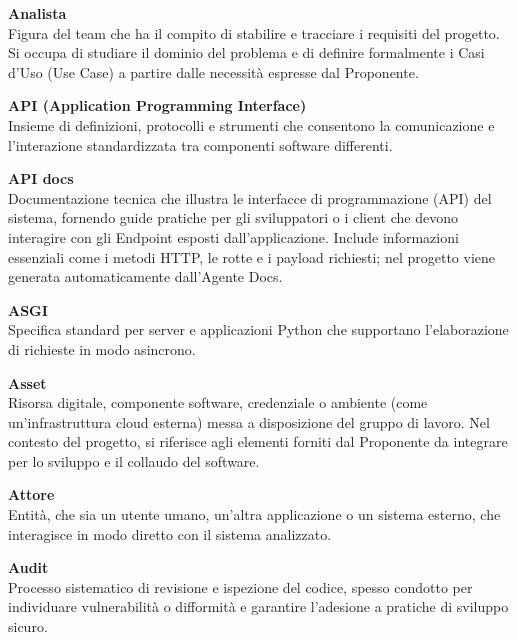 \documentclass[12pt, a4paper]{article}
\begin{document}
\noindent\hypertarget{analista}{\textbf{Analista}} \\[0.1em]
Figura del team che ha il compito di stabilire e tracciare i requisiti del progetto. Si occupa di studiare il dominio del problema e di definire formalmente i Casi d'Uso (Use Case) a partire dalle necessità espresse dal Proponente.
\vspace{0.5cm}

\noindent\hypertarget{api}{\textbf{API (Application Programming Interface)}} \\[0.1em]
Insieme di definizioni, protocolli e strumenti che consentono la comunicazione e l'interazione standardizzata tra componenti software differenti.
\vspace{0.5cm}

\noindent\hypertarget{api-docs}{\textbf{API docs}} \\[0.1em]
Documentazione tecnica che illustra le interfacce di programmazione (API) del sistema, fornendo guide pratiche per gli sviluppatori o i client che devono interagire con gli Endpoint esposti dall'applicazione. Include informazioni essenziali come i metodi HTTP, le rotte e i payload richiesti; nel progetto viene generata automaticamente dall'Agente Docs.
\vspace{0.5cm}

\noindent\hypertarget{asgi}{\textbf{ASGI}} \\[0.1em]
Specifica standard per server e applicazioni Python che supportano l'elaborazione di richieste in modo asincrono.
\vspace{0.5cm}

\noindent\hypertarget{asset}{\textbf{Asset}} \\[0.1em]
Risorsa digitale, componente software, credenziale o ambiente (come un'infrastruttura cloud esterna) messa a disposizione del gruppo di lavoro. Nel contesto del progetto, si riferisce agli elementi forniti dal Proponente da integrare per lo sviluppo e il collaudo del software.
\vspace{0.5cm}

\noindent\hypertarget{attore}{\textbf{Attore}} \\[0.1em]
Entità, che sia un utente umano, un'altra applicazione o un sistema esterno, che interagisce in modo diretto con il sistema analizzato.
\vspace{0.5cm}

\noindent\hypertarget{audit}{\textbf{Audit}} \\[0.1em]
Processo sistematico di revisione e ispezione del codice, spesso condotto per individuare vulnerabilità o difformità e garantire l'adesione a pratiche di sviluppo sicuro.
\vspace{0.5cm}
\end{document}
